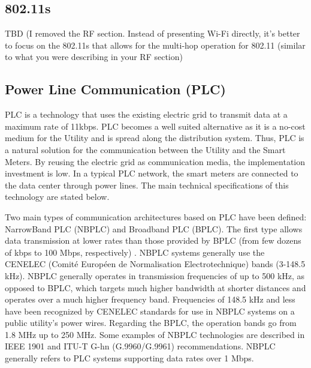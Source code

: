 \documentclass[11pt,draftclsnofoot,onecolumn]{IEEEtran}
\begin{document}
\subsection{802.11s}\label{tech::80211s}
TBD
(I removed the RF section. Instead of presenting Wi-Fi directly, it's better to focus on the 802.11s that allows for the multi-hop operation for 802.11 (similar to what you were describing in your RF section)

\subsection{Power Line Communication (PLC)}\label{tech::plc}

PLC is a technology that uses the existing electric grid to transmit data at a maximum rate of 11kbps. PLC becomes a well suited alternative as it is a no-cost medium for the Utility and is spread along the distribution system. Thus, PLC is a natural solution for the communication between the Utility and the Smart Meters. By reusing the electric grid as communication media, the implementation investment is low. In a typical PLC network, the smart meters are connected to the data center through power lines. The main technical specifications of this technology are stated below.

Two main types of communication architectures based on PLC have been defined: NarrowBand PLC (NBPLC) and Broadband PLC (BPLC). The first type allows data transmission at lower rates than those provided by BPLC (from few dozens of kbps to 100 Mbps, respectively) \cite{Sabbah2014}. NBPLC systems generally use the CENELEC (Comité Européen de Normalisation Electrotechnique) bands (3-148.5 kHz). NBPLC generally operates in transmission frequencies of up to 500 kHz, as opposed to BPLC, which targets much higher bandwidth at shorter distances and operates over a much higher frequency band. Frequencies of 148.5 kHz and less have been recognized by CENELEC standards for use in NBPLC systems on a public utility's power wires. Regarding the BPLC, the operation bands go from 1.8 MHz up to 250 MHz. Some examples of NBPLC technologies are described in IEEE 1901 and ITU-T G-hn (G.9960/G.9961) recommendations. NBPLC generally refers to PLC systems supporting data rates over 1 Mbps.
\end{document}

